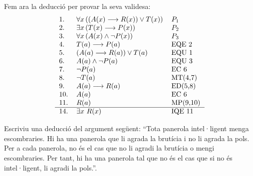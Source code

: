 \begin{solucio}
Fem ara la deducció per provar la seva validesa:%
\[%
\begin{tabular}
[c]{lll}%
1. & $\forall x\left(  \left(  A(x)\longrightarrow R(x)\right)  \vee
T(x)\right)  $ & $P_{1}$\\
2. & $\exists x\left(  T(x)\longrightarrow P(x)\right)  $ & $P_{2}$\\
3. & $\forall x\left(  A(x)\wedge\lnot P(x)\right)  $ & $P_{3}$\\
4. & $T(a)\longrightarrow P(a)$ & EQE 2\\
5. & $\left(  A(a)\longrightarrow R(a)\right)  \vee T(a)$ & EQU 1\\
6. & $A(a)\wedge\lnot P(a)$ & EQU 3\\
7. & $\lnot P(a)$ & EC 6\\
8. & $\lnot T(a)$ & MT(4,7)\\
9. & $A(a)\longrightarrow R(a)$ & ED(5,8)\\
10. & $A(a)$ & EC 6\\
11. & $R(a)$ & MP(9,10)\\\hline
14. & $\exists x~R(x)$ & IQE 11
\end{tabular}
\]

\end{solucio}

\begin{exercici}
Escriviu una deducció del argument següent: \enquote{Tota
panerola intel·ligent menga escombraries. Hi ha una
panerola que li agrada la brutícia i no li agrada la pols. Per a cada
panerola, no és el cas que no li agradi la brutícia o mengi
escombraries. Per tant, hi ha una panerola tal que no és el cas que si no
és intel·ligent, li agradi la pols.}.
\end{exercici}

